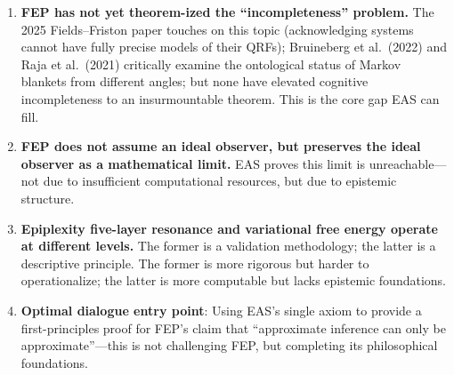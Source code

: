 \documentclass[11pt,a4paper]{article}
\begin{document}
\begin{enumerate}[leftmargin=*]
\item \textbf{FEP has not yet theorem-ized the ``incompleteness'' problem.} The 2025 Fields--Friston paper touches on this topic (acknowledging systems cannot have fully precise models of their QRFs); Bruineberg et al.\ (2022) and Raja et al.\ (2021) critically examine the ontological status of Markov blankets from different angles; but none have elevated cognitive incompleteness to an insurmountable theorem. This is the core gap EAS can fill.

\item \textbf{FEP does not assume an ideal observer, but preserves the ideal observer as a mathematical limit.} EAS proves this limit is unreachable---not due to insufficient computational resources, but due to epistemic structure.

\item \textbf{Epiplexity five-layer resonance and variational free energy operate at different levels.} The former is a validation methodology; the latter is a descriptive principle. The former is more rigorous but harder to operationalize; the latter is more computable but lacks epistemic foundations.

\item \textbf{Optimal dialogue entry point}: Using EAS's single axiom to provide a first-principles proof for FEP's claim that ``approximate inference can only be approximate''---this is not challenging FEP, but completing its philosophical foundations.
\end{enumerate}
\end{document}
